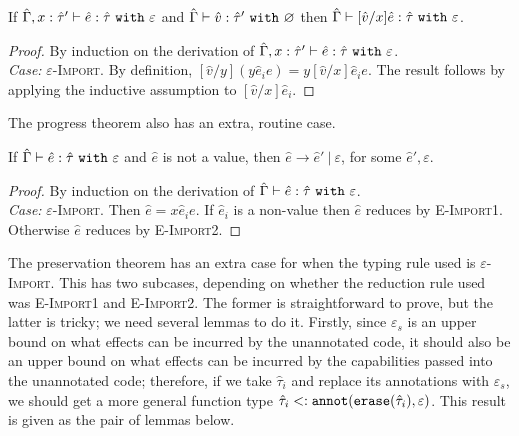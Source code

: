 \begin{lemma}
If $\hat \Gamma, x: \hat \tau' \vdash \hat e: \hat \tau~\mathtt{with}~ \varepsilon$ and $\hat \Gamma \vdash \hat v: \hat \tau'~\mathtt{with}~ \varnothing$ then $\hat \Gamma \vdash [\hat v/x]\hat e: \hat \tau~\mathtt{with}~ \varepsilon$.
\end{lemma}

\begin{proof} By induction on the derivation of $\hat \Gamma, x: \hat \tau' \vdash \hat e: \hat \tau~\mathtt{with}~ \varepsilon$.\\

\textit{Case:} \textsc{$\varepsilon$-Import}. By definition, $[\hat v/y]({y}{\hat e_i}{e}) = {y}{[\hat v/x] \hat e_i}{e}$. The result follows by applying the inductive assumption to $[\hat v/x] \hat e_i$.
\end{proof}

The progress theorem also has an extra, routine case.

\begin{theorem}
If $\hat \Gamma \vdash \hat e: \hat \tau~\mathtt{with}~ \varepsilon$ and $\hat e$ is not a value, then $\hat e \longrightarrow \hat e'~|~\varepsilon$, for some $\hat e', \varepsilon$.
\end{theorem}

\begin{proof} By induction on the derivation of $\hat \Gamma \vdash \hat e: \hat \tau~\mathtt{with}~ \varepsilon$.\\

\textit{Case:} \textsc{$\varepsilon$-Import}. Then $\hat e = {x}{\hat e_i}{e}$. If $\hat e_i$ is a non-value then $\hat e$ reduces by \textsc{E-Import1}. Otherwise $\hat e$ reduces by \textsc{E-Import2}.
\end{proof}

The preservation theorem has an extra case for when the typing rule used is \textsc{$\varepsilon$-Import}. This has two subcases, depending on whether the reduction rule used was \textsc{E-Import1} and \textsc{E-Import2}. The former is straightforward to prove, but the latter is tricky; we need several lemmas to do it. Firstly, since $\varepsilon_s$ is an upper bound on what effects can be incurred by the unannotated code, it should also be an upper bound on what effects can be incurred by the capabilities passed into the unannotated code; therefore, if we take $\hat \tau_i$ and replace its annotations with $\varepsilon_s$, we should get a more general function type $\hat \tau_i <: \mathtt{annot}(\mathtt{erase}(\hat \tau_i), \varepsilon)$. This result is given as the pair of lemmas below.

